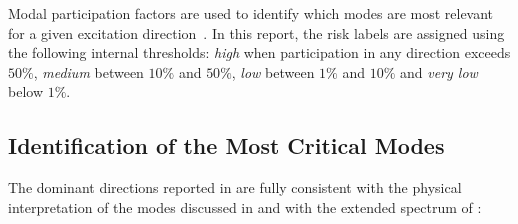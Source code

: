 Modal participation factors are used to identify which modes are most relevant for a given excitation direction~\cite{rao_mechanical_vibrations}. In this report, the risk labels are assigned using the following internal thresholds: \emph{high} when participation in any direction exceeds $50\%$, \emph{medium} between $10\%$ and $50\%$, \emph{low} between $1\%$ and $10\%$ and \emph{very low} below $1\%$.

\subsection{Identification of the Most Critical Modes}

The dominant directions reported in  are fully consistent with the physical interpretation of the modes discussed in  and with the extended spectrum of :

